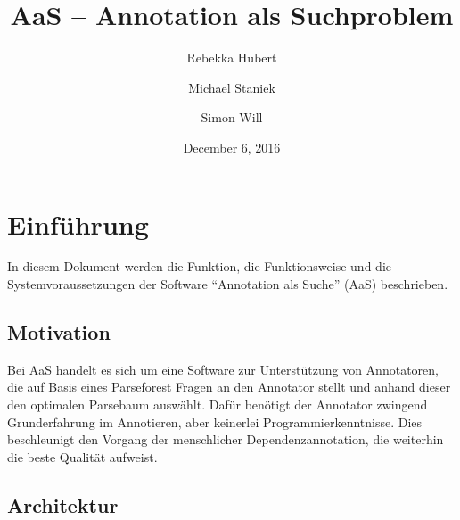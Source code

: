 \documentclass{scrartcl}
\title{AaS – Annotation als Suchproblem}
\author{Rebekka Hubert \and Michael Staniek \and Simon Will}
\date{December 6, 2016}
\begin{document}
\maketitle

\section{Einführung}
\label{sec:Einfuehrung}
In diesem Dokument werden die Funktion, die Funktionsweise und die Systemvoraussetzungen der Software \enquote{Annotation als Suche} (AaS) beschrieben.

\subsection{Motivation}
\label{sub:Motivation}
Bei AaS handelt es sich um eine Software zur Unterstützung von Annotatoren, die auf Basis eines Parseforest Fragen an den Annotator stellt und anhand dieser den optimalen Parsebaum auswählt. Dafür benötigt der Annotator zwingend Grunderfahrung im Annotieren, aber keinerlei Programmierkenntnisse. Dies beschleunigt den Vorgang der  menschlicher Dependenzannotation, die weiterhin die beste Qualität aufweist.

\subsection{Architektur}
\label{sub:Architektur}
\end{document}
